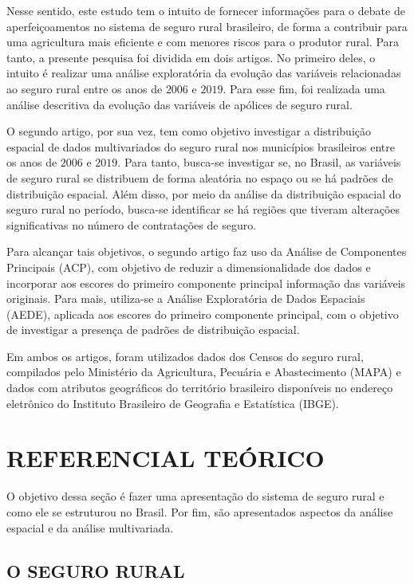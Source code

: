 \documentclass[12pt,a4paper]{article}
\begin{document}
Nesse sentido, este estudo tem  o intuito de fornecer informações para o debate de aperfeiçoamentos no sistema de seguro rural brasileiro, de forma a contribuir para uma agricultura mais eficiente e com menores riscos para o produtor rural. Para tanto, a presente pesquisa foi dividida em dois artigos. No primeiro deles, o intuito é realizar uma análise exploratória da evolução das variáveis relacionadas ao seguro rural entre os anos de $2006$ e $2019$. Para esse fim, foi realizada uma análise descritiva da evolução das variáveis de apólices de seguro rural. 

O segundo artigo, por sua vez, tem como objetivo investigar a distribuição espacial de dados multivariados do seguro rural nos municípios brasileiros entre os anos de $2006$ e $2019$. Para tanto, busca-se investigar se, no Brasil, as variáveis de seguro rural se distribuem de forma aleatória no espaço ou se há padrões de distribuição espacial. Além disso, por meio da análise da distribuição espacial do seguro rural no período, busca-se identificar se há regiões que tiveram alterações significativas no número de contratações de seguro. 

Para alcançar tais objetivos, o segundo artigo faz uso da Análise de Componentes Principais (ACP), com objetivo de reduzir a dimensionalidade dos dados e incorporar aos escores do primeiro componente principal informação das variáveis originais. Para mais, utiliza-se a Análise Exploratória de Dados Espaciais (AEDE), aplicada aos escores do primeiro componente principal, com o objetivo de investigar a presença de padrões de distribuição espacial.

Em ambos os artigos, foram utilizados dados dos Censos do seguro rural, compilados pelo Ministério da Agricultura, Pecuária e Abastecimento (MAPA) e dados com atributos geográficos do território brasileiro disponíveis no endereço eletrônico do Instituto Brasileiro de Geografia e Estatística (IBGE).

\newpage
\section{REFERENCIAL TEÓRICO}

O objetivo dessa seção é fazer uma apresentação do sistema de seguro rural e como ele se estruturou no Brasil. Por fim, são apresentados aspectos da análise espacial e da análise multivariada. 

\subsection{O SEGURO RURAL}
\end{document}
